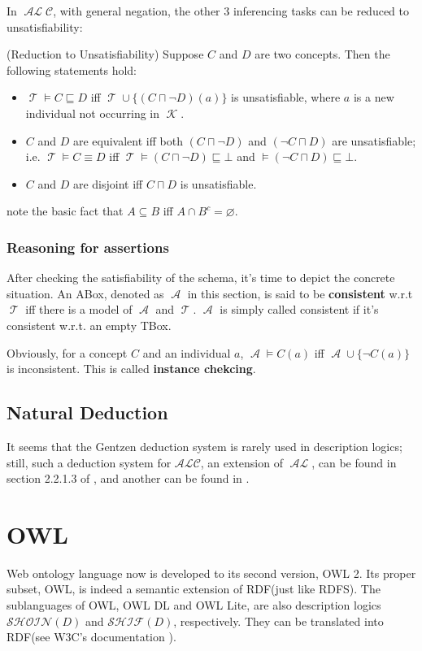 \documentclass{article}
\DeclareMathOperator{\al}{\mathcal{AL}}
\DeclareMathOperator{\kb}{\mathcal{K}}
\DeclareMathOperator{\tbox}{\mathcal{T}}
\DeclareMathOperator{\abox}{\mathcal{A}}
\begin{document}
In $\al\mathcal{C}$, with general negation, the other 3 inferencing tasks can be reduced to unsatisfiability:
\begin{pro}(Reduction to Unsatisfiability)\newline
Suppose $C$ and $D$ are two concepts. Then the following statements hold:
\begin{itemize}
\item $\tbox \vDash C \sqsubseteq D$ iff $\tbox\cup \{(C \sqcap \neg D)(a)\}$ is unsatisfiable, where $a$ is a new individual not occurring in $\kb$.
\item $C$ and $D$ are equivalent iff both $(C \sqcap \neg D)$ and $(\neg C \sqcap D)$ are unsatisfiable; i.e. $\tbox \vDash C \equiv D$ iff $\tbox\vDash (C \sqcap \neg D)\sqsubseteq \bot $ and $\vDash (\neg C \sqcap D) \sqsubseteq \bot$.
\item $C$ and $D$ are disjoint iff $C \sqcap D$ is unsatisfiable.
\end{itemize}
\end{pro}
note the basic fact that $A \subseteq B$ iff $A \cap B^c =\varnothing$.	

\subsubsection{Reasoning for assertions}
After checking the satisfiability of the schema, it's time to depict the concrete situation. An ABox, denoted as $\abox$ in this section, is said to be \textbf{consistent} w.r.t $\tbox$ iff there is a model of $\abox$ and $\tbox$. $\abox$ is simply called consistent if it's consistent w.r.t. an empty TBox.\newline

Obviously, for a concept $C$ and an individual $a$, $\abox \vDash C(a)$ iff $\abox \cup \{\neg C(a)\}$ is inconsistent. This is called \textbf{instance chekcing}.

\subsection{Natural Deduction}
It seems that the Gentzen deduction system is rarely used in description logics; still, such a deduction system for $\mathcal{ALC}$, an extension of $\al$, can be found in section 2.2.1.3 of \cite{proof}, and another can be found in \cite{rademaker2012proof}.\newline

\section{OWL}
Web ontology language now is developed to its second version, OWL 2.  Its proper subset, OWL, is indeed a semantic extension of RDF(just like RDFS). The sublanguages of OWL, OWL DL and OWL Lite, are also description logics $\mathcal{SHOIN}(D)$ and $\mathcal{SHIF}(D)$, respectively. They can be translated into RDF(see W3C's documentation \cite{OWL2RDF}).\newline 
\end{document}
